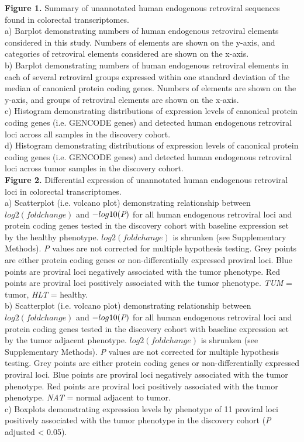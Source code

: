 \textbf{Figure 1.} Summary of unannotated human endogenous retroviral sequences found in colorectal transcriptomes. \\
a) Barplot demonstrating numbers of human endogenous retroviral elements considered in this study.
Numbers of elements are shown on the y-axis, and categories of retroviral elements considered are shown on the x-axis. \\
b) Barplot demonstrating numbers of human endogenous retroviral elements in each of several retroviral groups expressed within one standard deviation of the median of canonical protein coding genes.
Numbers of elements are shown on the y-axis, and groups of retroviral elements are shown on the x-axis. \\
c) Histogram demonstrating distributions of expression levels of canonical protein coding genes (i.e. GENCODE genes) and detected human endogenous retroviral loci across all samples in the discovery cohort. \\
d) Histogram demonstrating distributions of expression levels of canonical protein coding genes (i.e. GENCODE genes) and detected human endogenous retroviral loci across tumor samples in the discovery cohort. \\

\textbf{Figure 2.} Differential expression of unannotated human endogenous retroviral loci in colorectal transcriptomes. \\
a) Scatterplot (i.e. volcano plot) demonstrating relationship between $log2(fold change)$ and $-log10(\emph{P})$ for all human endogenous retroviral loci and protein coding genes tested in the discovery cohort with baseline expression set by the healthy phenotype.
$log2(fold change)$ is shrunken (see Supplementary Methods).
\emph{P} values are not corrected for multiple hypothesis testing.
Grey points are either protein coding genes or non-differentially expressed proviral loci.
Blue points are proviral loci negatively associated with the tumor phenotype.
Red points are proviral loci positively associated with the tumor phenotype.
\emph{TUM} = tumor, \emph{HLT} = healthy. \\
b) Scatterplot (i.e. volcano plot) demonstrating relationship between $log2(fold change)$ and $-log10(\emph{P})$ for all human endogenous retroviral loci and protein coding genes tested in the discovery cohort with baseline expression set by the tumor adjacent phenotype.
$log2(fold change)$ is shrunken (see Supplementary Methods).
\emph{P} values are not corrected for multiple hypothesis testing.
Grey points are either protein coding genes or non-differentially expressed proviral loci.
Blue points are proviral loci negatively associated with the tumor phenotype.
Red points are proviral loci positively associated with the tumor phenotype.
\emph{NAT} = normal adjacent to tumor. \\
c) Boxplots demonstrating expression levels by phenotype of 11 proviral loci positively associated with the tumor phenotype in the discovery cohort (\emph{P} adjusted < 0.05). \\

